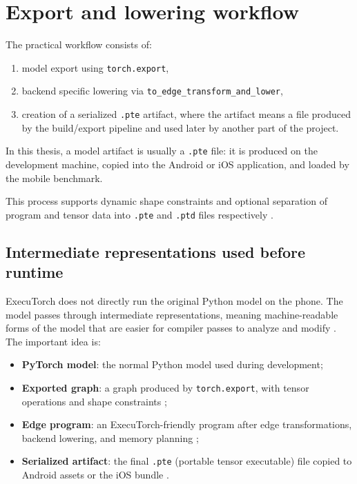 \section{Export and lowering workflow}

The practical workflow consists of:
\begin{enumerate}
    \item model export using \texttt{torch.export},
    \item backend specific lowering via
          \texttt{to\_edge\_transform\_and\_lower},
    \item creation of a serialized \texttt{.pte} artifact, where the artifact
          means a file produced by the build/export pipeline and used later by
          another part of the project.
\end{enumerate}

In this thesis, a model artifact is usually a \texttt{.pte} file: it is
produced on the development machine, copied into the Android or iOS
application, and loaded by the mobile benchmark.

This process supports dynamic shape constraints and optional separation of
program and tensor data into \texttt{.pte} and \texttt{.ptd} files respectively
\cite{executorch_export,executorch_pte,executorch_ptd,pytorch_export}.

\subsection{Intermediate representations used before runtime}

ExecuTorch does not directly run the original Python model on the phone. The
model passes through intermediate representations, meaning machine-readable
forms of the model that are easier for compiler passes to analyze and modify
\cite{executorch_arch}. The important idea is:
\begin{itemize}
    \item \textbf{PyTorch model}: the normal Python model used during
          development;
    \item \textbf{Exported graph}: a graph produced by \texttt{torch.export},
          with tensor operations and shape constraints \cite{pytorch_export};
    \item \textbf{Edge program}: an ExecuTorch-friendly program after edge
          transformations, backend lowering, and memory planning
          \cite{executorch_export,executorch_memory};
    \item \textbf{Serialized artifact}: the final \texttt{.pte} (portable
          tensor executable) file copied to Android assets or the iOS bundle
          \cite{executorch_pte}.
\end{itemize}

